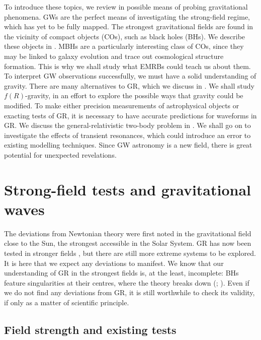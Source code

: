 To introduce these topics, we review in  possible means of probing gravitational phenomena. GWs are the perfect means of investigating the strong-field regime, which has yet to be fully mapped. The strongest gravitational fields are found in the vicinity of compact objects (COs), such as black holes (BHs). We describe these objects in . MBHs are a particularly interesting class of COs, since they may be linked to galaxy evolution and trace out cosmological structure formation. This is why we shall study what EMRBs could teach us about them. To interpret GW observations successfully, we must have a solid understanding of gravity. There are many alternatives to GR, which we discuss in . We shall study $f(R)$-gravity, in an effort to explore the possible ways that gravity could be modified. To make either precision measurements of astrophysical objects or exacting tests of GR, it is necessary to have accurate predictions for waveforms in GR. We discuss the general-relativistic two-body problem in . We shall go on to investigate the effects of transient resonances, which could introduce an error to existing modelling techniques. Since GW astronomy is a new field, there is great potential for unexpected revelations.

\section{Strong-field tests and gravitational waves}\label{sec:strong-field}

The deviations from Newtonian theory were first noted in the gravitational field close to the Sun, the strongest accessible in the Solar System. GR has now been tested in stronger fields \citep{Will2006}, but there are still more extreme systems to be explored. It is here that we expect any deviations to manifest. We know that our understanding of GR in the strongest fields is, at the least, incomplete: BHs feature singularities at their centres, where the theory breaks down (\citealt[section 34.6]{Misner1973}; \citealt[chapter 9]{Wald1984}). Even if we do not find any deviations from GR, it is still worthwhile to check its validity, if only as a matter of scientific principle.

\subsection{Field strength and existing tests}\label{sec:exist-tests}

